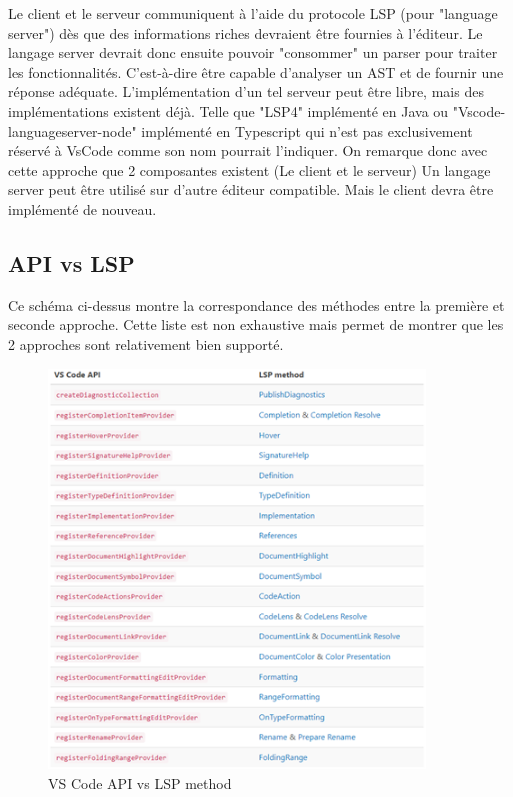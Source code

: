 \documentclass[
    iict, %
    il, %
]{heig-tb}
\begin{document}
Le client et le serveur communiquent à l'aide du protocole LSP (pour "language server") dès que des informations riches devraient être fournies à l'éditeur.
Le langage server devrait donc ensuite pouvoir "consommer" un parser pour traiter les fonctionnalités. C'est-à-dire être capable d'analyser un AST et de fournir une réponse adéquate.
L'implémentation d'un tel serveur peut être libre, mais des implémentations existent déjà. Telle que "LSP4" implémenté en Java ou  "Vscode-languageserver-node" implémenté en Typescript qui n'est pas exclusivement réservé à VsCode comme son nom pourrait l'indiquer.
On remarque donc avec cette approche que 2 composantes existent (Le client et le serveur)
Un langage server peut être utilisé sur d'autre éditeur compatible. Mais le client devra être implémenté de nouveau.

\subsection{API vs LSP}\label{api vs lsp}

Ce schéma ci-dessus montre la correspondance des méthodes entre la première et seconde approche.
Cette liste est non exhaustive mais permet de montrer que les 2 approches sont relativement bien supporté.

\begin{figure}[!ht]
    \begin{center}
        \includegraphics[width=10cm]{assets/figures/api-vscode.png}
    \end{center}
    \caption[API vs LSP]{\label{api vs lsp} VS Code API vs LSP method}
\end{figure}
\end{document}
